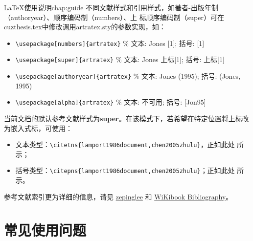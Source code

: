 \begin{cuzchapter}{\LaTeX{}使用说明}{chap:guide}
    不同文献样式和引用样式，如著者-出版年制（authoryear）、顺序编码制（numbers）、上
    标顺序编码制（super）可在cuzthesis.tex中修改调用artratex.sty的参数实现，如：
    \begin{itemize}
        \item \verb+\usepackage[numbers]{artratex}+ $\%$ 文本: Jones [1]; 括号: [1]
        \item \verb+\usepackage[super]{artratex}+ $\%$ 文本: Jones 上标[1]; 括号: 上标[1]
        \item \verb+\usepackage[authoryear]{artratex}+ $\%$ 文本: Jones (1995); 括号: (Jones, 1995)
        \item \verb+\usepackage[alpha]{artratex}+ $\%$ 文本: 不可用; 括号: [Jon95]
    \end{itemize}

    当前文档的默认参考文献样式为\textbf{super}。在该模式下，若希望在特定位置将上标改
    为嵌入式标，可使用：

    \begin{itemize}
        \item 文本类型：\verb|\citetns{lamport1986document,chen2005zhulu}|，正如此处
              所示；
        \item 括号类型：\verb|\citepns{lamport1986document,chen2005zhulu}|；正如此处
              所示。
    \end{itemize}

    参考文献索引更为详细的信息，请见
    \href{https://github.com/zepinglee/gbt7714-bibtex-style}{zepinglee} 和
    \href{https://en.wikibooks.org/wiki/LaTeX/Bibliography_Management}{WiKibook
        Bibliography}。


    \section{常见使用问题}\label{sec:qa}


\end{cuzchapter}
